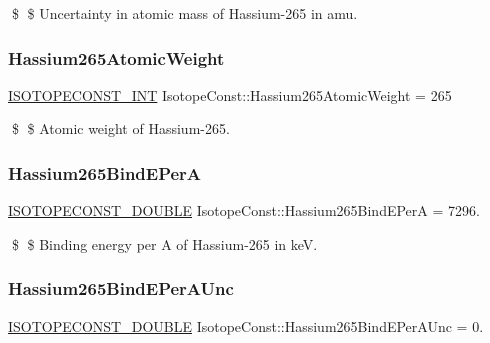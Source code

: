 \$ \$ Uncertainty in atomic mass of Hassium-\/265 in amu. \mbox{\label{group___isotope_const-_hassium-_hs265_gaf54c93167460fb61600e8aaa9c00ecad}} 
\subsubsection{\texorpdfstring{Hassium265\+Atomic\+Weight}{Hassium265AtomicWeight}}
{\footnotesize\ttfamily \mbox{\hyperlink{group___isotope_const-_macros_ga5f18360b3e99483a35c32d789e62621c}{I\+S\+O\+T\+O\+P\+E\+C\+O\+N\+S\+T\+\_\+\+I\+NT}} Isotope\+Const\+::\+Hassium265\+Atomic\+Weight = 265}

\$ \$ Atomic weight of Hassium-\/265. \mbox{\label{group___isotope_const-_hassium-_hs265_ga2a9743edead0dd4566fcc3e1e1e6286d}} 
\subsubsection{\texorpdfstring{Hassium265\+Bind\+E\+PerA}{Hassium265BindEPerA}}
{\footnotesize\ttfamily \mbox{\hyperlink{group___isotope_const-_macros_ga8f45a7272ce02c0b4c65c44636ed719a}{I\+S\+O\+T\+O\+P\+E\+C\+O\+N\+S\+T\+\_\+\+D\+O\+U\+B\+LE}} Isotope\+Const\+::\+Hassium265\+Bind\+E\+PerA = 7296.}

\$ \$ Binding energy per A of Hassium-\/265 in keV. \mbox{\label{group___isotope_const-_hassium-_hs265_gade34093ff23b18f205c2b8aabb7993ce}} 
\subsubsection{\texorpdfstring{Hassium265\+Bind\+E\+Per\+A\+Unc}{Hassium265BindEPerAUnc}}
{\footnotesize\ttfamily \mbox{\hyperlink{group___isotope_const-_macros_ga8f45a7272ce02c0b4c65c44636ed719a}{I\+S\+O\+T\+O\+P\+E\+C\+O\+N\+S\+T\+\_\+\+D\+O\+U\+B\+LE}} Isotope\+Const\+::\+Hassium265\+Bind\+E\+Per\+A\+Unc = 0.}

